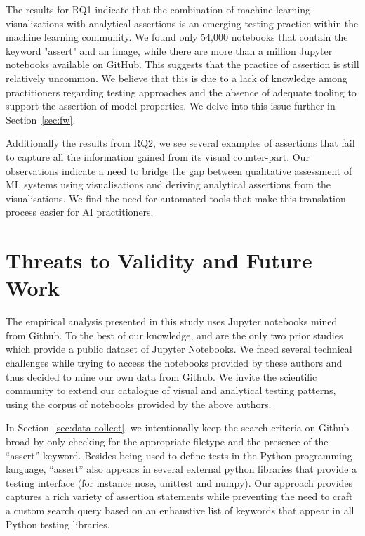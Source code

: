 \documentclass[conference]{IEEEtran}
\begin{document}
The results for RQ1 indicate that the combination of machine learning visualizations with analytical assertions is an emerging testing practice within the machine learning community. We found only 54,000 notebooks that contain the keyword "assert" and an image, while there are more than a million Jupyter notebooks available on GitHub. This suggests that the practice of assertion is still relatively uncommon.
We believe that this is due to a lack of knowledge among practitioners regarding testing approaches and the absence of adequate tooling to support the assertion of model properties. We delve into this issue further in Section~\ref{sec:fw}.

Additionally the results from RQ2, we see several examples of assertions that fail to capture all the information gained from its visual counter-part. Our observations indicate a need to bridge the gap between qualitative assessment of ML systems using visualisations and deriving analytical assertions from the visualisations. We find the need for automated tools that make this translation process easier for AI practitioners.

\section{Threats to Validity and Future Work}\label{sec:threats}

The empirical analysis presented in this study uses Jupyter notebooks mined from Github. To the best of our knowledge, \cite{pimentel2019large} and \cite{quaranta2021kgtorrent} are the only two prior studies which provide a public dataset of Jupyter Notebooks. We faced several technical challenges while trying to access the notebooks provided by these authors and thus decided to mine our own data from Github. We invite the scientific community to extend our catalogue of visual and analytical testing patterns, using the corpus of notebooks provided by the above authors.

In Section~\ref{sec:data-collect}, we intentionally keep the search criteria on Github broad by only checking for the appropriate filetype and the presence of the ``assert'' keyword. Besides being used to define tests in the Python programming language, ``assert'' also appears in several external python libraries that provide a testing interface (for instance nose, unittest and numpy). Our approach provides captures a rich variety of assertion statements while preventing the need to craft a custom search query based on an enhaustive list of keywords that appear in all Python testing libraries.
\end{document}
